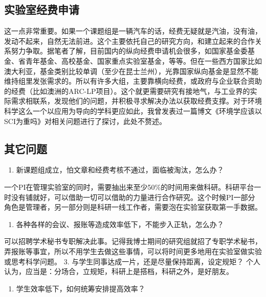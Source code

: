 \documentclass[
]{book}
\providecommand{\tightlist}{%
  \setlength{\itemsep}{0pt}\setlength{\parskip}{0pt}}
\begin{document}
\hypertarget{ux5b9eux9a8cux5ba4ux7ecfux8d39ux7533ux8bf7}{%
\subsection{实验室经费申请}\label{ux5b9eux9a8cux5ba4ux7ecfux8d39ux7533ux8bf7}}

这一点非常重要。如果一个课题组是一辆汽车的话，经费无疑就是汽油，没有油，发动不起来，自然无法前进。这个主要依托自己的研究方向，和建立起来的合作关系努力争取。据笔者了解，目前国内的纵向经费申请机会很多，如国家基金委基金、省青年基金、高校基金、国家重点实验室基金，等等。但在一些西方国家比如澳大利亚，基金类别比较单调（至少在昆士兰州），光靠国家纵向基金是显然不能维持组里发张需求的。所以有许多大组，主要靠横向经费，或政府与企业联合资助的经费（比如澳洲的ARC-LP项目）。这个就更需要研究有接地气，与工业界的实际需求相联系，发现他们的问题，并积极寻求解决办法以获取经费支撑。对于环境科学这么一个以应用为导向的学科更应如此，我曾发表过一篇博文《环境学应该以SCI为重吗》对相关问题进行了探讨，此处不赘述。

\hypertarget{ux5176ux5b83ux95eeux9898}{%
\subsection{其它问题}\label{ux5176ux5b83ux95eeux9898}}

\begin{enumerate}
\def\labelenumi{\arabic{enumi}.}
\tightlist
\item
  新课题组成立，怕文章和经费考核不通过，面临被淘汰，怎么办？
\end{enumerate}

一个PI在管理实验室的同时，需要抽出来至少50\%的时间用来做科研。科研平台一时没有铺就好，可以借助一切可以借助的力量进行合作研究。这个时候PI一部分角色是管理者，另一部分则是科研一线工作者，需要泡在实验室获取第一手数据。

\begin{enumerate}
\def\labelenumi{\arabic{enumi}.}
\setcounter{enumi}{1}
\tightlist
\item
  各种各样的会议、报账等造成效率低下，不能步入正轨，怎么办？
\end{enumerate}

可以招聘学术秘书专职解决此事。记得我博士期间的研究组就招了专职学术秘书，弄报账等事宜，所以不用学生去做这些事情，可以将时间更多地用在实验室做实验或思考科学问题。
3. 与学生同事达成一片，还是尽量保持距离，设定规矩？
个人认为，应当是：分场合，立规矩，科研上是搭档，科研之外，是好朋友。

\begin{enumerate}
\def\labelenumi{\arabic{enumi}.}
\setcounter{enumi}{3}
\tightlist
\item
  学生效率低下，如何统筹安排提高效率？
\end{enumerate}
\end{document}

